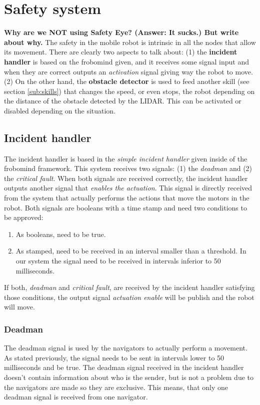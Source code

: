 \section{Safety system} %
\label{sec:mr_safety_system}
\textbf{Why are we NOT using Safety Eye? (Answer: It sucks.) But write about why.}
The safety in the mobile robot is intrinsic in all the nodes that allow its movement.
There are clearly two aspects to talk about: (1) the \textbf{incident handler} is based on the frobomind given, and it receives some signal input and when they are correct outputs an \emph{activation} signal giving way the robot to move.
(2) On the other hand, the \textbf{obstacle detector} is used to feed another skill (see section \ref{sub:skills}) that changes the speed, or even stops, the robot depending on the distance of the obstacle detected by the LIDAR.
This can be activated or disabled depending on the situation.
	\subsection{Incident handler} %
	\label{sub:mr_incident_handler}
	The incident handler is based in the \emph{simple incident handler} given inside of the frobomind framework.
	This system receives two signals: (1) the \emph{deadman} and (2) the \emph{critical fault}.
	When both signals are received correctly, the incident handler outputs another signal that \emph{enables the actuation}.
	This signal is directly received from the system that actually performs the actions that move the motors in the robot.
	Both signals are booleans with a time stamp and need two conditions to be approved:
	\begin{enumerate}
		\item As booleans, need to be true.
		\item As stamped, need to be received in an interval smaller than a threshold. In our system the signal need to be received in intervals inferior to 50 milliseconds.
	\end{enumerate}
	If both, \emph{deadman} and \emph{critical fault}, are received by the incident handler satisfying those conditions, the output signal \emph{actuation enable} will be publish and the robot will move.
		\subsubsection{Deadman} %
		\label{ssub:mr_deadman}
		The deadman signal is used by the navigators to actually perform a movement.
		As stated previously, the signal needs to be sent in intervals lower to 50 milliseconds and be true.
		The deadman signal received in the incident handler doesn't contain information about who is the sender, but is not a problem due to the navigators are made so they are exclusive.
		This means, that only one deadman signal is received from one navigator.

